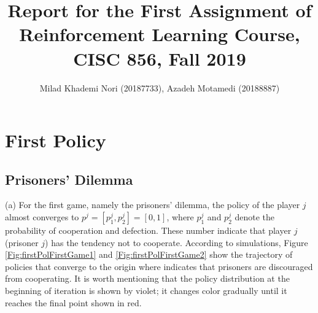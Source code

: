 \documentclass[journal]{IEEEtran}
\begin{document}
\title{Report for the First Assignment of Reinforcement Learning Course, CISC 856, Fall 2019}


\author{Milad Khademi Nori (20187733), Azadeh Motamedi (20188887)}%

\maketitle



\IEEEpeerreviewmaketitle


\section{First Policy}
\subsection{Prisoners' Dilemma}
(a) For the first game, namely the prisoners' dilemma, the policy of the player $j$ almost converges to $p^{j}= [p^{j}_{1}, p_{2}^{j}]=[0, 1]$, where $p^{j}_{1}$ and $p^{j}_{2}$ denote the probability of cooperation and defection. These number indicate that player $j$ (prisoner $j$) has the tendency not to cooperate. According to simulations, Figure \ref{Fig:firstPolFirstGame1} and \ref{Fig:firstPolFirstGame2} show the trajectory of policies that converge to the origin where indicates that prisoners are discouraged from cooperating. It is worth mentioning that the policy distribution at the beginning of iteration is shown by violet; it changes color gradually until it reaches the final point shown in red. %
\end{document}
